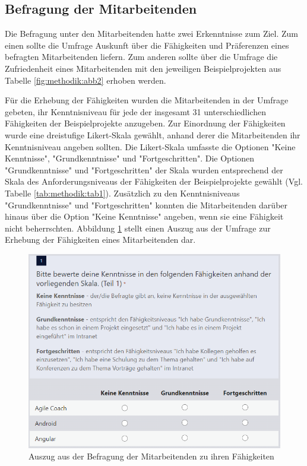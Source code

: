 \subsection{Befragung der Mitarbeitenden}
Die Befragung unter den Mitarbeitenden hatte zwei Erkenntnisse zum Ziel.
Zum einen sollte die Umfrage Auskunft über die Fähigkeiten und Präferenzen eines befragten Mitarbeitenden liefern.
Zum anderen sollte über die Umfrage die Zufriedenheit eines Mitarbeitenden mit den jeweiligen Beispielprojekten aus Tabelle \ref{fig:methodik:abb2} erhoben werden.

Für die Erhebung der Fähigkeiten wurden die Mitarbeitenden in der Umfrage gebeten, ihr Kenntnisniveau für jede der insgesamt 31 unterschiedlichen Fähigkeiten der Beispielprojekte anzugeben.
Zur Einordnung der Fähigkeiten wurde eine dreistufige Likert-Skala gewählt, anhand derer die Mitarbeitenden ihr Kenntnisniveau angeben sollten.
Die Likert-Skala umfasste die Optionen "Keine Kenntnisse", "Grundkenntnisse" und "Fortgeschritten".
Die Optionen "Grundkenntnisse" und "Fortgeschritten" der Skala wurden entsprechend der Skala des Anforderungsniveaus der Fähigkeiten der Beispielprojekte gewählt (Vgl. Tabelle \ref{tab:methodik:tab1}).
Zusätzlich zu den Kenntnisniveaus "Grundkenntnisse" und "Fortgeschritten" konnten die Mitarbeitenden darüber hinaus über die Option "Keine Kenntnisse" angeben, wenn sie eine Fähigkeit nicht beherrschten.
Abbildung \ref{fig:methodik:abb3} stellt einen Auszug aus der Umfrage zur Erhebung der Fähigkeiten eines Mitarbeitenden dar.

\begin{figure}[H]
    \centering
	\includegraphics[width=1\textwidth]{gfx/befragung-faehigkeiten.png}
	\caption[Auszug aus der Befragung der Mitarbeitenden zu ihren Fähigkeiten]{Auszug aus der Befragung der Mitarbeitenden zu ihren Fähigkeiten}
	\label{fig:methodik:abb3}
\end{figure}

